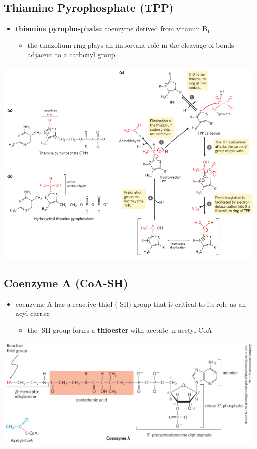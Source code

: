 \documentclass[10pt]{article}
\begin{document}
\subsection*{Thiamine Pyrophosphate (TPP)}
\begin{itemize}
	\item \textbf{thiamine pyrophosphate:} coenzyme derived from vitamin B$_1$
	\begin{itemize}
        \item the thiazolium ring plays an important role in the cleavage of bonds adjacent to a carbonyl group
    \end{itemize}
\end{itemize}
\begin{center} 
	\includegraphics*[width=\textwidth]{L2_15.png} 
\end{center}

\subsection*{Coenzyme A (CoA-SH)}
\begin{itemize}
	\item coenzyme A has a reactive thiol (-SH) group that is critical to its role as an acyl carrier
	\begin{itemize}
        \item the -SH group forms a \textbf{thioester} with acetate in acetyl-CoA
    \end{itemize}
\end{itemize}
\begin{center} 
    \includegraphics*[width=\textwidth]{L3_12.png}
\end{center}
\end{document}
